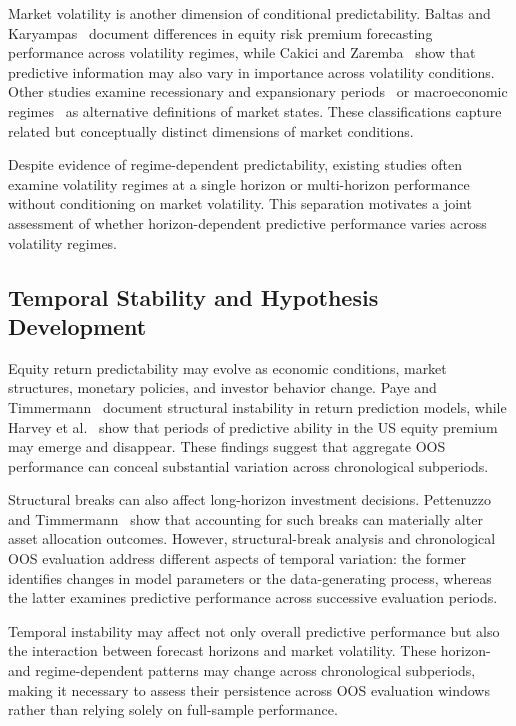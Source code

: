 \documentclass[runningheads,orivec]{llncs}
\begin{document}
Market volatility is another dimension of conditional predictability. Baltas and Karyampas~\cite{baltas2018} document differences in equity risk premium forecasting performance across volatility regimes, while Cakici and Zaremba~\cite{cakici2025} show that predictive information may also vary in importance across volatility conditions. Other studies examine recessionary and expansionary periods~\cite{li2017} or macroeconomic regimes~\cite{hammerschmid2018} as alternative definitions of market states. These classifications capture related but conceptually distinct dimensions of market conditions.

Despite evidence of regime-dependent predictability, existing studies often examine volatility regimes at a single horizon or multi-horizon performance without conditioning on market volatility. This separation motivates a joint assessment of whether horizon-dependent predictive performance varies across volatility regimes.

\subsection{Temporal Stability and Hypothesis Development}

Equity return predictability may evolve as economic conditions, market structures, monetary policies, and investor behavior change. Paye and Timmermann~\cite{paye2006} document structural instability in return prediction models, while Harvey et al.~\cite{harvey2021} show that periods of predictive ability in the US equity premium may emerge and disappear. These findings suggest that aggregate OOS performance can conceal substantial variation across chronological subperiods.

Structural breaks can also affect long-horizon investment decisions. Pettenuzzo and Timmermann~\cite{pettenuzzo2011} show that accounting for such breaks can materially alter asset allocation outcomes. However, structural-break analysis and chronological OOS evaluation address different aspects of temporal variation: the former identifies changes in model parameters or the data-generating process, whereas the latter examines predictive performance across successive evaluation periods.

Temporal instability may affect not only overall predictive performance but also the interaction between forecast horizons and market volatility. These horizon- and regime-dependent patterns may change across chronological subperiods, making it necessary to assess their persistence across OOS evaluation windows rather than relying solely on full-sample performance.
\end{document}

